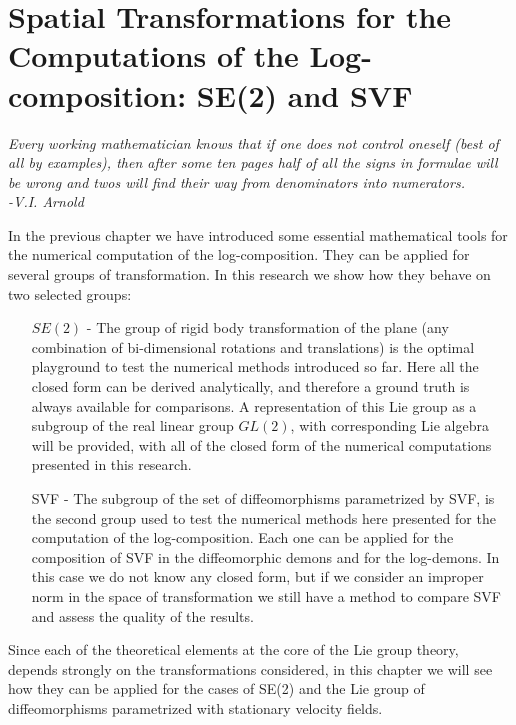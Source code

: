 \chapter{Spatial Transformations for the Computations of the Log-composition: SE(2) and SVF}\label{ch:spatial_transformations}


\begin{flushright}
	\emph{Every working mathematician knows that if one does not control oneself (best of all by examples), then after some ten pages half of all the signs in formulae will be wrong and twos will find their way from denominators into numerators. \\ -V.I. Arnold}
\end{flushright}

In the previous chapter we have introduced some essential mathematical tools for the numerical computation of the log-composition. They can be applied for several groups of transformation. In this research we show how they behave on two selected groups:
\begin{enumerate}
	\item[$SE(2)$ -] The group of rigid body transformation of the plane (any combination of bi-dimensional rotations and translations) is the optimal playground to test the numerical methods introduced so far. Here all the closed form can be derived analytically, and therefore a ground truth is always available for comparisons. A representation of this Lie group as a subgroup of the real linear group $GL(2)$, with corresponding Lie algebra will be provided, with all of the closed form of the numerical computations presented in this research.
	\item[SVF -] The subgroup of the set of diffeomorphisms parametrized by SVF, is the second group used to test the numerical methods here presented for the computation of the log-composition. Each one can be applied for the composition of SVF in the diffeomorphic demons and for the log-demons. In this case we do not know any closed form, but if we consider an improper norm in the space of transformation we still have a method to compare SVF and assess the quality of the results.
\end{enumerate}

\noindent
Since each of the theoretical elements at the core of the Lie group theory, depends strongly on the transformations considered, in this chapter we will see how they can be applied for the cases of SE(2) and the Lie group of diffeomorphisms parametrized with stationary velocity fields.

